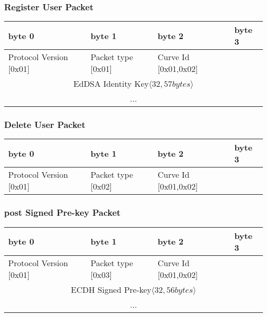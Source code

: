 \documentclass[a4paper,11pt]{article}
\begin{document}
    \subsubsection{Register User Packet}
      \begin{center}
      \begin{tabular}{ | p{1.4in} | p{1.4in} | p{1.4in} | p{1.4in} |}
        \hline
        \cellcolor[gray]{0.85} byte 0 & \cellcolor[gray]{0.85} byte 1 & \cellcolor[gray]{0.85} byte 2 & \cellcolor[gray]{0.85}byte 3\\
        \hline
        Protocol Version [0x01] & Packet type [0x01] & Curve Id [0x01,0x02] &\\
        \cline{1-3}
        \multicolumn{4}{|c|}{EdDSA Identity Key$\langle 32,57bytes\rangle $}\\
        \multicolumn{4}{|c|}{...}\\
        \hline
      \end{tabular}
      \end{center}
    
    \subsubsection{Delete User Packet}
      \begin{center}
      \begin{tabular}{ | p{1.4in} | p{1.4in} | p{1.4in} | p{1.4in} |}
        \hline
        \cellcolor[gray]{0.85} byte 0 & \cellcolor[gray]{0.85} byte 1 & \cellcolor[gray]{0.85} byte 2 & \cellcolor[gray]{0.85}byte 3\\
        \hline
        Protocol Version [0x01] & Packet type [0x02] & Curve Id [0x01,0x02] & \\
        \hline
      \end{tabular}
      \end{center}

    \subsubsection{post Signed Pre-key Packet}
      \begin{center}
      \begin{tabular}{ | p{1.4in} | p{1.4in} | p{1.4in} | p{1.4in} |}
        \hline
        \cellcolor[gray]{0.85} byte 0 & \cellcolor[gray]{0.85} byte 1 & \cellcolor[gray]{0.85} byte 2 & \cellcolor[gray]{0.85}byte 3\\
        \hline
        Protocol Version [0x01] & Packet type [0x03] & Curve Id [0x01,0x02] & \\
        \cline{1-3}
        \multicolumn{4}{|c|}{ECDH Signed Pre-key$\langle 32,56bytes\rangle $}\\
        \multicolumn{4}{|c|}{...}\\
        \hline
      \end{tabular}
      \end{center}
    
\end{document}
